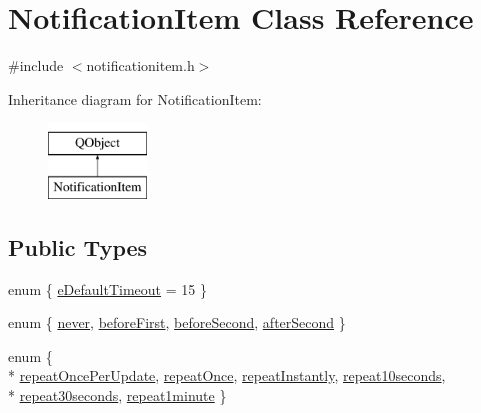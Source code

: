 \hypertarget{class_notification_item}{\section{Notification\-Item Class Reference}
\label{class_notification_item}
}


{\ttfamily \#include $<$notificationitem.\-h$>$}

Inheritance diagram for Notification\-Item\-:\begin{figure}[H]
\begin{center}
\leavevmode
\includegraphics[height=2.000000cm]{class_notification_item}
\end{center}
\end{figure}
\subsection*{Public Types}
\begin{DoxyCompactItemize}
\item 
enum \{ \hyperlink{group__notifyplugin_ggaa52522623ea593ea4ed734f3e904d7d4a8fee5829d0108684543cf01a53af668f}{e\-Default\-Timeout} = 15
 \}
\item 
enum \{ \hyperlink{group__notifyplugin_gga06504fecf1d1894e31d55d101309a379a908fb8bab8f2e2e5aae18d53fe643c1e}{never}, 
\hyperlink{group__notifyplugin_gga06504fecf1d1894e31d55d101309a379af3a07edb74d1ab9b39fd6db3b1d6ad00}{before\-First}, 
\hyperlink{group__notifyplugin_gga06504fecf1d1894e31d55d101309a379ac0e140c5209cc791f99fc19ddf8fe6f0}{before\-Second}, 
\hyperlink{group__notifyplugin_gga06504fecf1d1894e31d55d101309a379a95117a3c7ab2e169b43a3121a329a43a}{after\-Second}
 \}
\item 
enum \{ \\*
\hyperlink{group__notifyplugin_gga506482c4a81f715a735c84b55f36a72ca1a55bc3c686d15eb1e9d010b7a07a50a}{repeat\-Once\-Per\-Update}, 
\hyperlink{group__notifyplugin_gga506482c4a81f715a735c84b55f36a72ca13280fe30c3bd30abf86825b504b6ec7}{repeat\-Once}, 
\hyperlink{group__notifyplugin_gga506482c4a81f715a735c84b55f36a72ca49596c4af726c4fb52dbfe7df33c7178}{repeat\-Instantly}, 
\hyperlink{group__notifyplugin_gga506482c4a81f715a735c84b55f36a72cac3e73d8efe76007eeca66f2cfb609075}{repeat10seconds}, 
\\*
\hyperlink{group__notifyplugin_gga506482c4a81f715a735c84b55f36a72ca18a34ac252d2f02c618ee1a4aae6ce9e}{repeat30seconds}, 
\hyperlink{group__notifyplugin_gga506482c4a81f715a735c84b55f36a72ca014d745bf7f8943763a58f8c55d5891b}{repeat1minute}
 \}
\end{DoxyCompactItemize}
